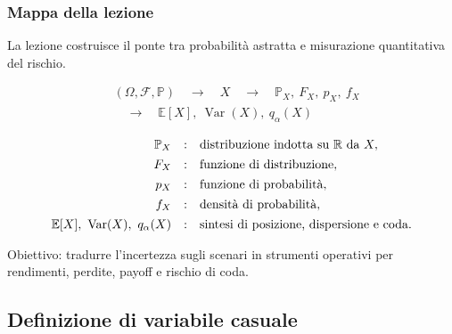 \documentclass[handout]{beamer}%
\providecommand{\E}{\mathbb{E}}
\providecommand{\Prob}{\mathbb{P}}
\providecommand{\F}{\mathcal{F}}
\providecommand{\1}{\mathbf{1}}
\providecommand{\Var}{\operatorname{Var}}
\providecommand{\QTR}[2]{\csname #1\endcsname{#2}}
\begin{document}
\begin{frame}%
%

\frametitle{Mappa della lezione}%


La lezione costruisce il ponte tra probabilit\`{a} astratta e misurazione
quantitativa del rischio.%

\[
\begin{aligned}
&(\Omega,\F,\Prob)
\quad\longrightarrow\quad X
\quad\longrightarrow\quad \Prob_X,\ F_X,\ p_X,\ f_X\\[4pt]
&\quad\longrightarrow\quad \E[X],\ \Var(X),\ q_\alpha(X)
\end{aligned}
\]


\medskip%

\[%
\begin{array}
[c]{rcl}%
\Prob_{X} & : & \mbox{distribuzione indotta su $\mathbb{R}$ da } X,\\[4pt]%
F_{X} & : & \mbox{funzione di distribuzione},\\[4pt]%
p_{X} & : & \mbox{funzione di probabilit\`{a}},\\[4pt]%
f_{X} & : & \mbox{densit\`{a} di probabilit\`{a}},\\[4pt]%
\E[X],\ \Var(X),\ q_{\alpha}(X) & : &
\mbox{sintesi di posizione, dispersione e coda}.
\end{array}
\]


\medskip

Obiettivo: tradurre l'incertezza sugli scenari in strumenti operativi per
rendimenti, perdite, payoff e rischio di coda.%

\transboxout
\end{frame}%




\subsection{Definizione di variabile casuale}%
\end{document}
